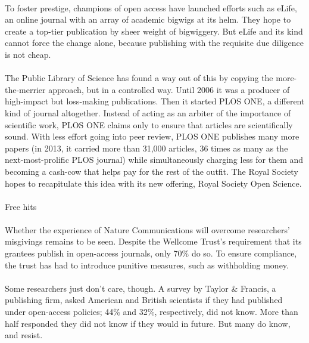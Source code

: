 \documentclass[a4paper, 12pt, UTF8]{article}
\begin{document}
\paragraph*{}
    To foster prestige, champions of open access have launched efforts such as eLife, an online journal with an array of academic bigwigs at its helm. They hope to create a top-tier publication by sheer weight of bigwiggery. But eLife and its kind cannot force the change alone, because publishing with the requisite due diligence is not cheap.

\paragraph*{}
    The Public Library of Science has found a way out of this by copying the more-the-merrier approach, but in a controlled way. Until 2006 it was a producer of high-impact but loss-making publications. Then it started PLOS ONE, a different kind of journal altogether. Instead of acting as an arbiter of the importance of scientific work, PLOS ONE claims only to ensure that articles are scientifically sound. With less effort going into peer review, PLOS ONE publishes many more papers (in 2013, it carried more than 31,000 articles, 36 times as many as the next-most-prolific PLOS journal) while simultaneously charging less for them and becoming a cash-cow that helps pay for the rest of the outfit. The Royal Society hopes to recapitulate this idea with its new offering, Royal Society Open Science.

\paragraph*{}
    \begin{bfseries}
        \large
        Free hits
    \end{bfseries}

\paragraph*{}
    Whether the experience of Nature Communications will overcome researchers’ misgivings remains to be seen. Despite the Wellcome Trust’s requirement that its grantees publish in open-access journals, only 70\% do so. To ensure compliance, the trust has had to introduce punitive measures, such as withholding money.

\paragraph*{}
    Some researchers just don’t care, though. A survey by Taylor \& Francis, a publishing firm, asked American and British scientists if they had published under open-access policies; 44\% and 32\%, respectively, did not know. More than half responded they did not know if they would in future. But many do know, and resist.
\end{document}

